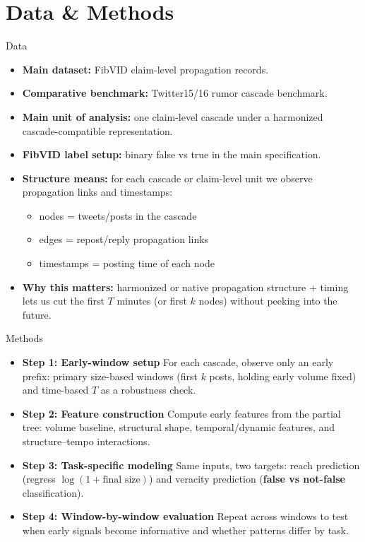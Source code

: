\documentclass{beamer}
\begin{document}
\section{Data \& Methods}
\begin{frame}{Data}
\begin{itemize}
\item \textbf{Main dataset:} FibVID claim-level propagation records.
\item \textbf{Comparative benchmark:} Twitter15/16 rumor cascade benchmark.
\item \textbf{Main unit of analysis:} one claim-level cascade under a harmonized cascade-compatible representation.
\item \textbf{FibVID label setup:} binary false vs true in the main specification.
\item \textbf{Structure means:} for each cascade or claim-level unit we observe propagation links and timestamps:
\begin{itemize}
\item nodes = tweets/posts in the cascade
\item edges = repost/reply propagation links
\item timestamps = posting time of each node
\end{itemize}
\item \textbf{Why this matters:} harmonized or native propagation structure + timing lets us cut the first \(T\) minutes (or first \(k\) nodes) without peeking into the future.
\end{itemize}
\end{frame}

\begin{frame}{Methods}
\begin{itemize}
\item \textbf{Step 1: Early-window setup} For each cascade, observe only an early prefix: primary size-based windows (first \(k\) posts, holding early volume fixed) and time-based \(T\) as a robustness check.
\item \textbf{Step 2: Feature construction} Compute early features from the partial tree: volume baseline, structural shape, temporal/dynamic features, and structure--tempo interactions.
\item \textbf{Step 3: Task-specific modeling} Same inputs, two targets: reach prediction (regress \(\log(1+\text{final size})\)) and veracity prediction (\textbf{false vs not-false} classification).
\item \textbf{Step 4: Window-by-window evaluation} Repeat across windows to test when early signals become informative and whether patterns differ by task.
\end{itemize}
\end{frame}
\end{document}
